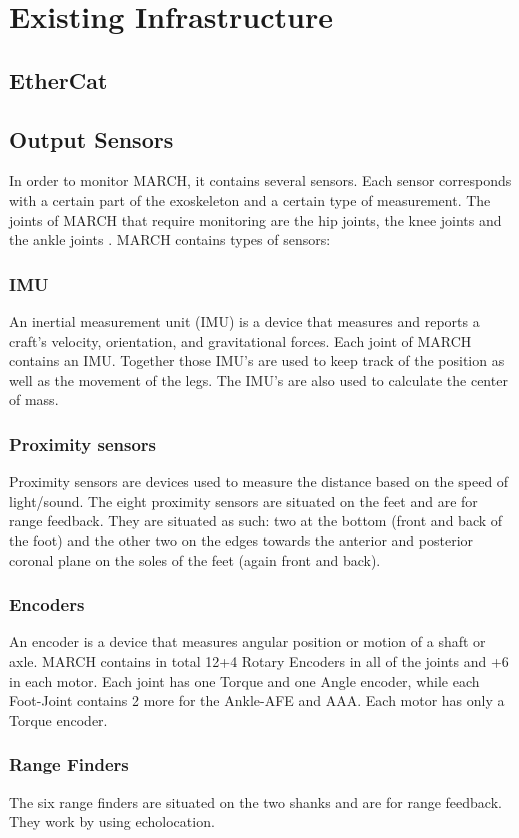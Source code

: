 \section{Existing Infrastructure}
\subsection{EtherCat}
\label{sec:etherCat}

\subsection{Output Sensors}
In order to monitor MARCH, it contains several sensors. Each sensor corresponds with a certain part of the exoskeleton and a certain type of measurement. The joints of MARCH that require monitoring are the hip joints, the knee joints and the ankle joints . MARCH contains  types of sensors:
\subsubsection{IMU}
An inertial measurement unit (IMU) is a device that measures and reports a craft's velocity, orientation, and gravitational forces. Each joint of MARCH contains an IMU. Together those IMU's are used to keep track of the position as well as the movement of the legs. The IMU's are also used to calculate the center of mass. 
\subsubsection{Proximity sensors}
Proximity sensors are devices used to measure the distance based on the speed of light/sound. The eight proximity sensors are situated on the feet and are for range feedback. They are situated as such: two at the bottom (front and back of the foot) and the other two on the edges towards the anterior and posterior coronal plane on the soles of the feet (again front and back). 

\subsubsection{Encoders}
An encoder is a device that measures angular position or motion of a shaft or axle. MARCH contains in total 12+4 Rotary Encoders in all of the joints and +6 in each motor. Each joint has one Torque and one Angle encoder, while each Foot-Joint contains 2 more for the Ankle-AFE and AAA. Each motor has only a Torque encoder.
\subsubsection{Range Finders}
The six range finders are situated on the two shanks and are for range feedback. They work by using echolocation.
